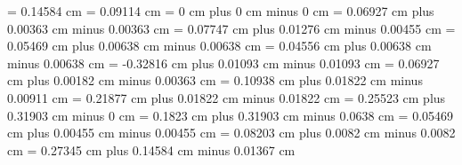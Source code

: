 
\newcount\greconffactor
{}

\makeatletter %

\gre@additionallineswidth = 0.14584 cm
\gre@additionalcustoslineswidth = 0.09114 cm
\gre@zerowidthspace = 0 cm plus 0 cm minus 0 cm
\gre@interglyphspace = 0.06927 cm plus 0.00363 cm minus 0.00363 cm
\gre@alterationspace = 0.07747 cm plus 0.01276 cm minus 0.00455 cm
\gre@clefflatspace = 0.05469 cm plus 0.00638 cm minus 0.00638 cm
\gre@beforechoralsignspace = 0.04556 cm plus 0.00638 cm minus 0.00638 cm
\gre@beforealterationspace = -0.32816 cm plus 0.01093 cm minus 0.01093 cm
\gre@interelementspace = 0.06927 cm plus 0.00182 cm minus 0.00363 cm
\gre@largerspace = 0.10938 cm plus 0.01822 cm minus 0.00911 cm
\gre@glyphspace = 0.21877 cm plus 0.01822 cm minus 0.01822 cm
\gre@intersyllablespace= 0.25523 cm plus 0.31903 cm minus 0 cm
\gre@spacebeforecusto = 0.1823 cm plus 0.31903 cm minus 0.0638 cm
\gre@spacebeforesigns= 0.05469 cm plus 0.00455 cm minus 0.00455 cm
\gre@spaceaftersigns= 0.08203 cm plus 0.0082 cm minus 0.0082 cm
\gre@spaceafterlineclef = 0.27345 cm plus 0.14584 cm minus 0.01367 cm
